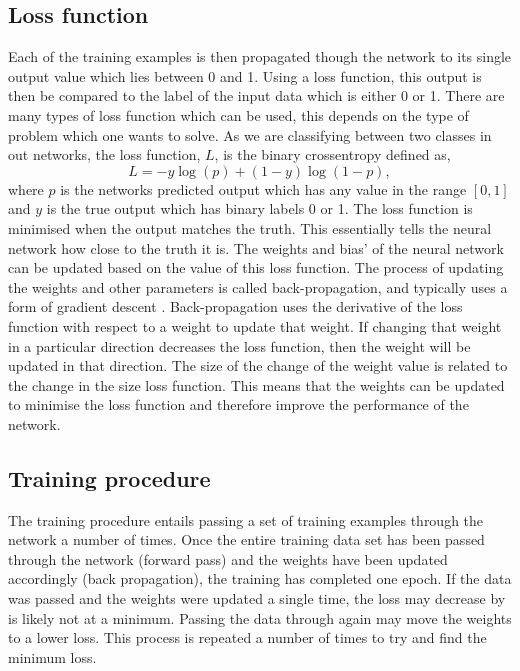 \subsection{Loss function}

%
Each of the training examples is then propagated though the network to its single output value which lies between 0 and 1. Using a loss function, this output is then be compared to
the label of the input data which is either 0 or 1. There are many types of loss function which can be used, this depends on the type of problem which one wants to solve. As we are classifying
between two classes in out networks, the loss function, $L$, is the binary
crossentropy defined as,
%
\begin{equation}\label{cnn:loss} 
L = -y\log{(p)} + (1-y)\log{(1-p)},
\end{equation}
%
where $p$ is the networks predicted output which has any value in the range $[0,1]$ and $y$ is the true output which has binary labels 0 or 1. 
The loss function is minimised when the output matches the truth. This essentially
tells the neural network how close to the truth it is. The weights and bias' of
the neural network can be updated based on the value of this loss function. The
process of updating the weights and other parameters is called back-propagation,
and typically uses a form of gradient descent
\cite{kingma2015AdamMethod}.
Back-propagation uses the derivative of the loss function with respect to a weight to update that weight.
If changing that weight in a particular direction decreases the loss function, then the weight will be updated in that direction.
The size of the change of the weight value is related to the change in the size loss function.
This means that the weights can be updated to minimise the loss function and therefore improve the performance of the network.

\subsection{Training procedure}

The training procedure entails passing a set of training examples through the network a number of times. 
Once the entire training data set has been passed through the network (forward pass) and the weights have been updated accordingly (back propagation), the training has completed one epoch.
If the data was passed and the weights were updated a single time, the loss may decrease by is likely not at a minimum.
Passing the data through again may move the weights to a lower loss.
This process is repeated a number of times to try and find the minimum loss.

